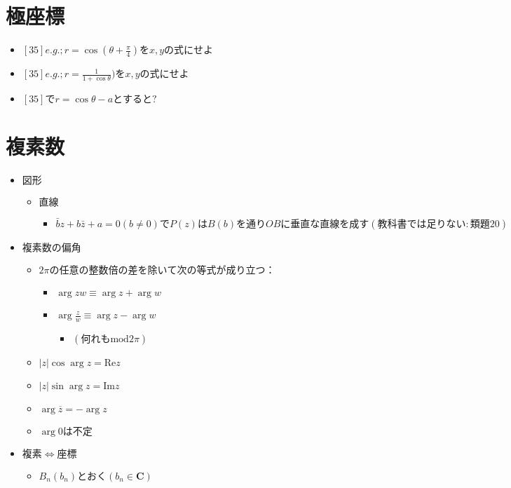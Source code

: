 \documentclass[dvipdfmx,uplatex]{jsarticle}
\begin{document}
\section{極座標}
\begin{itemize}
	\item $ [35]e.g.;r= \cos ( \theta + \frac{\pi}{4})をx,yの式にせよ$ 
	\item $ [35]e.g.;r= \frac{1}{1+ \cos \theta})をx,yの式にせよ$ 
	\item $ [35]でr= \cos \theta -aとすると?$
\end{itemize}

\section{複素数}
\begin{itemize}
	\item $ 図形$
	\begin{itemize}
		\item $ 直線$
		\begin{itemize}
			\item $ \bar{b} z + b \bar{z}+ a = 0 (b \neq 0) でP(z)はB(b)を通りOBに垂直な直線を成す(教科書では足りない:類題20)$
		\end{itemize}
	\end{itemize}
	\item $ 複素数の偏角$
		\begin{itemize}
			\item $ 2 \pi の任意の整数倍の差を除いて次の等式が成り立つ：$
			\begin{itemize}
				\item $ \arg zw \equiv \arg z + \arg w$
				\item $ \arg \frac{z}{w} \equiv \arg z − \arg w$
				\begin{itemize}
					\item $ (何れも \mathrm{mod} 2 \pi)$
				\end{itemize}
			\end{itemize}
		\item $ |z| \cos \arg z = \mathrm{Re} z$
		\item $ |z| \sin \arg z = \mathrm{Im} z$
		\item $ \arg \overline{z} = - \arg z$
		\item $ \arg 0 は不定$
	\end{itemize}
	\item $ 複素 \Leftrightarrow 座標$
	\begin{itemize}
		\item $ B_n(b_n)とおく (b_n \in \bm{C})$

\end{itemize}
\end{itemize}
\end{document}
